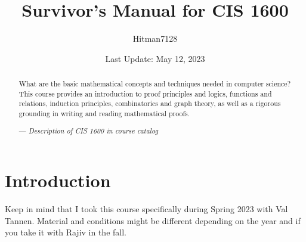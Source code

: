 \documentclass[11pt]{scrartcl}
\begin{document}
\title{Survivor's Manual for CIS 1600}
\author{Hitman7128}
\date{Last Update: May 12, 2023}
\maketitle

\begin{abstract}
	\sffamily\small
What are the basic mathematical concepts and techniques needed in computer science? This course provides an introduction to proof principles and logics, functions and relations, induction principles, combinatorics and graph theory, as well as a rigorous grounding in writing and reading mathematical proofs.

	\medskip
	
	--- \emph{Description of CIS 1600 in course catalog}
\end{abstract}

\tableofcontents
\eject

\section{Introduction}
Keep in mind that I took this course specifically during Spring 2023 with Val Tannen. Material and conditions might be different depending on the year and if you take it with Rajiv in the fall.
\end{document}
